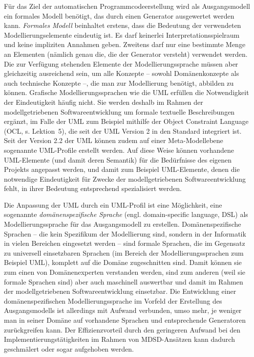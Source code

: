 Für das Ziel der automatischen Programmcodeerstellung wird als Ausgangsmodell ein formales Modell benötigt, das durch einen Generator ausgewertet werden kann. 
\textit{Formales Modell} beinhaltet erstens, dass die Bedeutung der verwendeten Modellierungselemente eindeutig ist. Es darf keinerlei Interpretationsspielraum und keine impliziten Annahmen geben. Zweitens darf nur eine bestimmte Menge an Elementen (nämlich genau die, die der Generator versteht) verwendet werden. Die zur Verfügung stehenden Elemente der Modellierungssprache müssen aber gleichzeitig ausreichend sein, um alle Konzepte – sowohl Domänenkonzepte als auch technische Konzepte –, die man zur Modellierung benötigt, abbilden zu können. Grafische Modellierungssprachen wie die UML erfüllen die Notwendigkeit der Eindeutigkeit häufig nicht. Sie werden deshalb im Rahmen der modellgetriebenen Softwareentwicklung um formale textuelle Beschreibungen ergänzt, im Falle der UML zum Beispiel mithilfe der Object Constraint Language (OCL, s. Lektion~5),
die seit der UML Version 2 in den Standard integriert ist. Seit der Version 2.2 der UML können zudem auf einer Meta-Modellebene sogenannte UML-Profile erstellt werden. Auf diese Weise können vorhandene UML-Elemente (und damit deren Semantik) für die Bedürfnisse des eigenen Projekts angepasst werden, und damit zum Beispiel UML-Elemente, denen die notwendige Eindeutigkeit für Zwecke der modellgetriebenen Softwareentwicklung fehlt, in ihrer Bedeutung entsprechend spezialisiert werden. 

Die 
Anpassung der UML durch ein UML-Profil ist eine Möglichkeit, eine sogenannte \textit{domänenspezifische Sprache} (engl. domain-specific language, DSL) als Modellierungssprache für das Ausgangsmodell zu erstellen. Domänenspezifische Sprachen – die kein Spezifikum der Modellierung sind, sondern in der Informatik in vielen Bereichen eingesetzt werden – sind formale Sprachen, die im Gegensatz zu universell einsetzbaren Sprachen (im Bereich der Modellierungssprachen zum Beispiel UML), komplett auf die Domäne zugeschnitten sind. Damit können sie zum einen von Domänenexperten verstanden werden, sind zum anderen (weil sie formale Sprachen sind) aber auch maschinell auswertbar und damit im Rahmen der modellgetriebenen Softwareentwicklung einsetzbar. Die Entwicklung einer domänenspezifischen Modellierungssprache im Vorfeld der Erstellung des Ausgangsmodells ist allerdings mit Aufwand verbunden, umso mehr, je weniger man in seiner Domäne auf vorhandene Sprachen und entsprechende Generatoren zurückgreifen kann. Der Effizienzvorteil durch den geringeren Aufwand bei den Implementierungstätigkeiten im Rahmen von MDSD-Ansätzen kann dadurch geschmälert oder sogar aufgehoben werden. 

